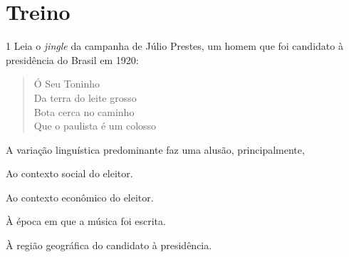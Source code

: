 
\section*{Treino}

\num{1} Leia o \emph{jingle} da campanha de Júlio Prestes, um homem que
foi candidato à presidência do Brasil em 1920:

\begin{quote}
Ó Seu Toninho\\
Da terra do leite grosso\\
Bota cerca no caminho\\
Que o paulista é um colosso\\
\end{quote}

\noindent A variação linguística predominante faz uma alusão, principalmente,

\begin{escolha}
\item Ao contexto social do eleitor.
\item Ao contexto econômico do eleitor.
\item À época em que a música foi escrita.
\item À região geográfica do candidato à presidência.
\end{escolha}



